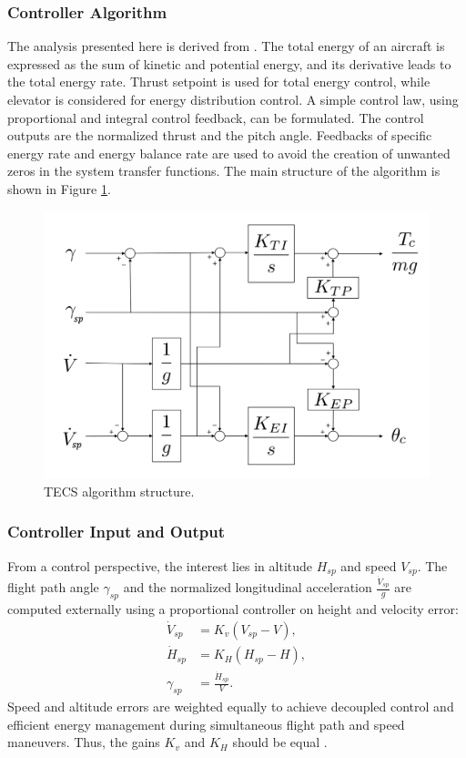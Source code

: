 \subsubsection{Controller Algorithm}
The analysis presented here is derived from \cite{faleiro1999analysis}. The total energy of an aircraft is expressed as the sum of kinetic and potential energy, and its derivative leads to the total energy rate. Thrust setpoint is used for total energy control, while elevator is considered for energy distribution control. A simple control law, using proportional and integral control feedback, can be formulated. The control outputs are the normalized thrust and the pitch angle. Feedbacks of specific energy rate and energy balance rate are used to avoid the creation of unwanted zeros in the system transfer functions. The main structure of the algorithm is shown in Figure \ref{fig:TECS algorithm structure}.

\begin{figure}
    \centering
    \includegraphics[width=0.9\linewidth]{Images/TECS algorithm structure..png}
    \caption{TECS algorithm structure.}
    \label{fig:TECS algorithm structure}
\end{figure}

\subsubsection{Controller Input and Output}
From a control perspective, the interest lies in altitude \( H_{sp} \) and speed \( V_{sp} \). The flight path angle \( \gamma_{sp} \) and the normalized longitudinal acceleration \( \frac{{\dot{V}_{sp}}}{{g}} \) are computed externally using a proportional controller on height and velocity error:
\begin{align}
    \dot{V}_{sp} &= K_v (V_{sp} - V), \\
    \dot{H}_{sp} &= K_H (H_{sp} - H), \\
    \gamma_{sp} &= \frac{{\dot{H}_{sp}}}{{V}}.
\end{align}
Speed and altitude errors are weighted equally to achieve decoupled control and efficient energy management during simultaneous flight path and speed maneuvers. Thus, the gains \( K_v \) and \( K_H \) should be equal \cite{faleiro1999analysis}.

